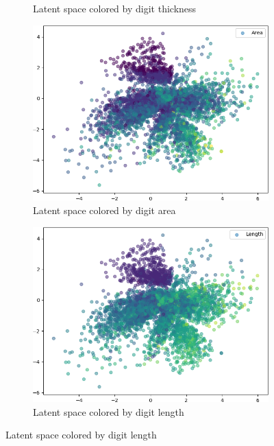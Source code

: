 \begin{figure}[H]
\begin{subfigure}{.32\textwidth}
        \caption{Latent space colored by digit thickness}
        \label{subfig:vae_mnist_latent_space_thickness}
    \end{subfigure}
    \hfill
    \begin{subfigure}{.32\textwidth}
        \includegraphics[width=\textwidth]{images/latent_spaces/mnist/vae_gan/embeddings_mu_2.png}
        \caption{Latent space colored by digit area}
        \label{subfig:vae_mnist_latent_space_area}
    \end{subfigure}
    \hfill
    \begin{subfigure}{.24\textwidth}
        \includegraphics[width=\textwidth]{images/latent_spaces/mnist/vae_gan/embeddings_mu_3.png}
        \caption{Latent space colored by digit length}

\end{subfigure}
\end{figure}
